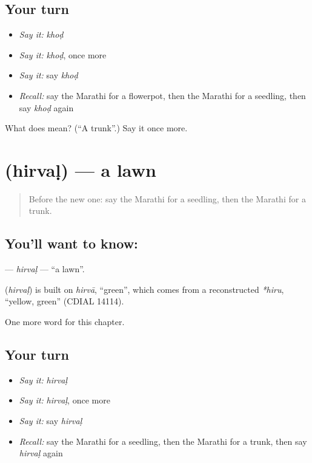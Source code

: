 \subsection*{Your turn}
\begin{itemize}
\raggedright
  \item \emph{Say it:} \emph{khoḍ}
  \item \emph{Say it:} \emph{khoḍ}, once more
  \item \emph{Say it:} say \emph{khoḍ}
  \item \emph{Recall:} say the Marathi for a flowerpot, then the Marathi for a seedling, then say \emph{khoḍ} again
\end{itemize}

\begin{tcolorbox}[breakable,colback=teal!4,colframe=teal!35!black,title={Before you move on}]
What does  mean? (\textquotedblleft{}A trunk\textquotedblright{}.) Say it once more.
\end{tcolorbox}
\section[\texorpdfstring{\mr{हिरवळ} (hirvaḷ)}{हिरवळ (hirvaḷ)}]{ (hirvaḷ) — a lawn}

\label{lesson:MR-C241-hirval}



\begin{quote}
Before the new one: say the Marathi for a seedling, then the Marathi for a trunk.
\end{quote}

\subsection*{You'll want to know: }
\textbf{} — \emph{hirvaḷ} — \textquotedblleft{}a lawn\textquotedblright{}.

\begin{cousinweb}
\textbf{} (\emph{hirvaḷ}) is built on \emph{hirvā}, \textquotedblleft{}green\textquotedblright{}, which comes from a reconstructed \emph{*hiru}, \textquotedblleft{}yellow, green\textquotedblright{} (CDIAL 14114).
\end{cousinweb}

\begin{grammarlens}[title={What you've built}]
One more word for this chapter.
\end{grammarlens}

\subsection*{Your turn}
\begin{itemize}
\raggedright
  \item \emph{Say it:} \emph{hirvaḷ}
  \item \emph{Say it:} \emph{hirvaḷ}, once more
  \item \emph{Say it:} say \emph{hirvaḷ}
  \item \emph{Recall:} say the Marathi for a seedling, then the Marathi for a trunk, then say \emph{hirvaḷ} again
\end{itemize}

